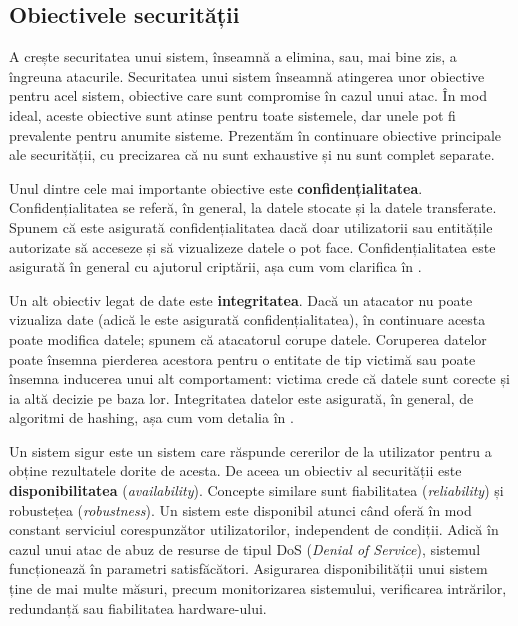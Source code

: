 \subsection{Obiectivele securității}
\label{sec:sec:fundamentals:objectives}

A crește securitatea unui sistem, înseamnă a elimina, sau, mai bine zis, a îngreuna atacurile. Securitatea unui sistem înseamnă atingerea unor obiective pentru acel sistem, obiective care sunt compromise în cazul unui atac. În mod ideal, aceste obiective sunt atinse pentru toate sistemele, dar unele pot fi prevalente pentru anumite sisteme. Prezentăm în continuare obiective principale ale securității, cu precizarea că nu sunt exhaustive și nu sunt complet separate.

Unul dintre cele mai importante obiective este \textbf{confidențialitatea}. Confidențialitatea se referă, în general, la datele stocate și la datele transferate. Spunem că este asigurată confidențialitatea dacă doar utilizatorii sau entitățile autorizate să acceseze și să vizualizeze datele o pot face. Confidențialitatea este asigurată în general cu ajutorul criptării, așa cum vom clarifica în .

Un alt obiectiv legat de date este \textbf{integritatea}. Dacă un atacator nu poate vizualiza date (adică le este asigurată confidențialitatea), în continuare acesta poate modifica datele; spunem că atacatorul corupe datele. Coruperea datelor poate însemna pierderea acestora pentru o entitate de tip victimă sau poate însemna inducerea unui alt comportament: victima crede că datele sunt corecte și ia altă decizie pe baza lor. Integritatea datelor este asigurată, în general, de algoritmi de hashing, așa cum vom detalia în .

Un sistem sigur este un sistem care răspunde cererilor de la utilizator pentru a obține rezultatele dorite de acesta. De aceea un obiectiv al securității este \textbf{disponibilitatea} (\textit{availability}). Concepte similare sunt fiabilitatea (\textit{reliability}) și robustețea (\textit{robustness}). Un sistem este disponibil atunci când oferă în mod constant serviciul corespunzător utilizatorilor, independent de condiții. Adică în cazul unui atac de abuz de resurse de tipul DoS (\textit{Denial of Service}), sistemul funcționează în parametri satisfăcători. Asigurarea disponibilității unui sistem ține de mai multe măsuri, precum monitorizarea sistemului, verificarea intrărilor, redundanță sau fiabilitatea hardware-ului.

